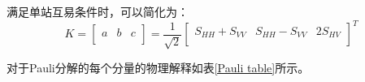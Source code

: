 满足单站互易条件时，可以简化为：
\begin{equation}
    K=\left[ \begin{matrix}
            a & b & c \\
        \end{matrix} \right] =\frac{1}{\sqrt{2}}\left[ \begin{matrix}
            S_{HH}+S_{VV} & S_{HH}-S_{VV} & 2S_{HV} \\
        \end{matrix} \right] ^T
\end{equation}

对于Pauli分解的每个分量的物理解释如表\ref{Pauli table}所示。
\begin{table}[h]
    \caption{Pauli分解}
    \linespread{1.5} %
    \setlength{\arraycolsep}{10pt} %


    \label{Pauli table}
\end{table}

